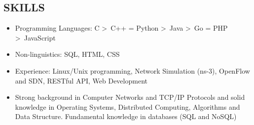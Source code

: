 \documentclass[line]{res}
\begin{document}
\begin{resume}
	\section{SKILLS}
	\begin{itemize}
		\item Programming Languages: C \textgreater \ C++ = Python \textgreater \ Java \textgreater \ Go = PHP \textgreater \ JavaScript
		\item Non-linguistics: SQL, HTML, CSS
		\item Experience: Linux/Unix programming, Network Simulation (ns-3), OpenFlow and SDN, RESTful API, Web Development
		\item Strong background in Computer Networks and TCP/IP Protocols and solid knowledge in Operating Systems, Distributed Computing, Algorithms and Data Structure. Fundamental knowledge in databases (SQL and NoSQL)
	\end{itemize}


\end{resume}
\end{document}
